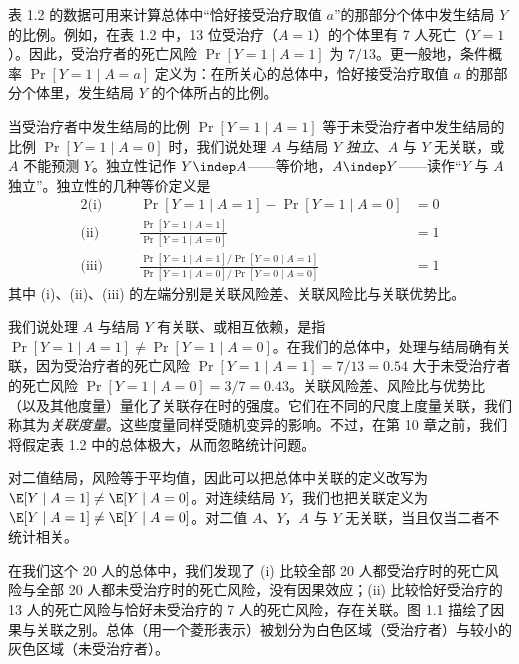 表 1.2 的数据可用来计算总体中“恰好接受治疗取值 $a$”的那部分个体中发生结局 $Y$ 的比例。例如，在表 1.2 中，13 位受治疗（$A=1$）的个体里有 7 人死亡（$Y=1$）。因此，受治疗者的死亡风险 $\Pr[Y=1\mid A=1]$ 为 $7/13$。更一般地，条件概率 $\Pr[Y=1\mid A=a]$ 定义为：在所关心的总体中，恰好接受治疗取值 $a$ 的那部分个体里，发生结局 $Y$ 的个体所占的比例。

当受治疗者中发生结局的比例 $\Pr[Y=1\mid A=1]$ 等于未受治疗者中发生结局的比例 $\Pr[Y=1\mid A=0]$ 时，我们说处理 $A$ 与结局 $Y$ \emph{独立}、$A$ 与 $Y$ 无关联，或 $A$ 不能预测 $Y$。独立性记作 $Y\indep A$——等价地，$A\indep Y$——读作“$Y$ 与 $A$ 独立”。独立性的几种等价定义是
\begin{alignat*}{2}
\text{(i)}\quad && \Pr[Y=1\mid A=1]-\Pr[Y=1\mid A=0] &= 0\\
\text{(ii)}\quad && \frac{\Pr[Y=1\mid A=1]}{\Pr[Y=1\mid A=0]} &= 1\\
\text{(iii)}\quad && \frac{\Pr[Y=1\mid A=1]/\Pr[Y=0\mid A=1]}{\Pr[Y=1\mid A=0]/\Pr[Y=0\mid A=0]} &= 1
\end{alignat*}
其中 (i)、(ii)、(iii) 的左端分别是关联风险差、关联风险比与关联优势比。


我们说处理 $A$ 与结局 $Y$ 有关联、或相互依赖，是指 $\Pr[Y=1\mid A=1]\neq\Pr[Y=1\mid A=0]$。在我们的总体中，处理与结局确有关联，因为受治疗者的死亡风险 $\Pr[Y=1\mid A=1]=7/13=0.54$ 大于未受治疗者的死亡风险 $\Pr[Y=1\mid A=0]=3/7=0.43$。关联风险差、风险比与优势比（以及其他度量）量化了关联存在时的强度。它们在不同的尺度上度量关联，我们称其为\emph{关联度量}。这些度量同样受随机变异的影响。不过，在第 10 章之前，我们将假定表 1.2 中的总体极大，从而忽略统计问题。


对二值结局，风险等于平均值，因此可以把总体中关联的定义改写为 $\E[Y\mid A=1]\neq\E[Y\mid A=0]$。对连续结局 $Y$，我们也把关联定义为 $\E[Y\mid A=1]\neq\E[Y\mid A=0]$。对二值 $A$、$Y$，$A$ 与 $Y$ 无关联，当且仅当二者不统计相关。

在我们这个 20 人的总体中，我们发现了 (i) 比较全部 20 人都受治疗时的死亡风险与全部 20 人都未受治疗时的死亡风险，没有因果效应；(ii) 比较恰好受治疗的 13 人的死亡风险与恰好未受治疗的 7 人的死亡风险，存在关联。图 1.1 描绘了因果与关联之别。总体（用一个菱形表示）被划分为白色区域（受治疗者）与较小的灰色区域（未受治疗者）。

